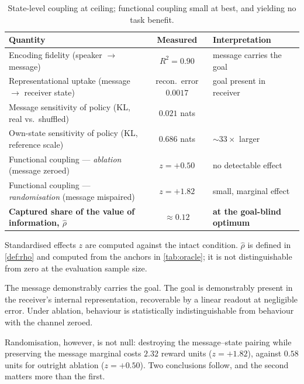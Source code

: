 \documentclass[11pt,a4paper]{article}
\theoremstyle{plain}
\theoremstyle{definition}
\theoremstyle{remark}
\begin{document}
\begin{table}[t]
\centering
\small
\begin{threeparttable}
\begin{tabular}{@{}p{} c p{}@{}}
\toprule
\textbf{Quantity} & \textbf{Measured} & \textbf{Interpretation} \\
\midrule
Encoding fidelity (speaker $\to$ message) & $R^2 = 0.90$ & message carries the goal \\
Representational uptake (message $\to$ receiver state) & recon.\ error $0.0017$ & goal present in receiver \\
Message sensitivity of policy (KL, real vs.\ shuffled) & $0.021$ nats & \\
Own-state sensitivity of policy (KL, reference scale) & $0.686$ nats & ${\sim}33\times$ larger \\
\midrule
Functional coupling --- \emph{ablation} (message zeroed) & $z = +0.50$ & no detectable effect \\
Functional coupling --- \emph{randomisation} (message mispaired) & $z = +1.82$ & small, marginal effect \\
\textbf{Captured share of the value of information, $\hat{\rho}$} & $\mathbf{\approx 0.12}$ & \textbf{at the goal-blind optimum} \\
\bottomrule
\end{tabular}
\begin{tablenotes}[flushleft]\footnotesize
\item Standardised effects $z$ are computed against the intact condition. $\hat{\rho}$ is defined in
\cref{def:rho} and computed from the anchors in \cref{tab:oracle}; it is not distinguishable from
zero at the evaluation sample size.
\end{tablenotes}
\end{threeparttable}
\caption{State-level coupling at ceiling; functional coupling small at best, and yielding no task
benefit.}
\label{tab:gap}
\end{table}

The message demonstrably carries the goal. The goal is demonstrably present in the receiver's
internal representation, recoverable by a linear readout at negligible error. Under ablation,
behaviour is statistically indistinguishable from behaviour with the channel zeroed.

Randomisation, however, is not null: destroying the message--state pairing while preserving the
message marginal costs $2.32$ reward units ($z = +1.82$), against $0.58$ units for outright
ablation ($z = +0.50$). Two conclusions follow, and the second matters more than the first.
\end{document}
